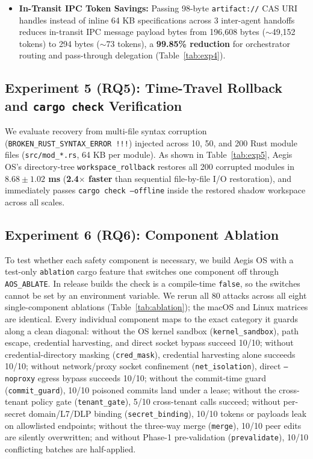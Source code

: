 \documentclass[acmsmall,screen,review]{acmart}
\begin{document}
\begin{itemize}
    \item \textbf{In-Transit IPC Token Savings:} Passing 98-byte \texttt{artifact://} CAS URI handles instead of inline 64 KB specifications across 3 inter-agent handoffs reduces in-transit IPC message payload bytes from 196,608 bytes ($\sim$49,152 tokens) to 294 bytes ($\sim$73 tokens), a \textbf{99.85\% reduction} for orchestrator routing and pass-through delegation (Table~\ref{tab:exp4}).
\end{itemize}

\subsection{Experiment 5 (RQ5): Time-Travel Rollback and \texttt{cargo check} Verification}

We evaluate recovery from multi-file syntax corruption (\texttt{BROKEN\_RUST\_SYNTAX\_ERROR !!!}) injected across 10, 50, and 200 Rust module files (\texttt{src/mod\_*.rs}, 64 KB per module). As shown in Table~\ref{tab:exp5}, Aegis OS's directory-tree \texttt{workspace\_rollback} restores all 200 corrupted modules in \textbf{$8.68 \pm 1.02$ ms} (\textbf{2.4$\times$ faster} than sequential file-by-file I/O restoration), and immediately passes \texttt{cargo check --offline} inside the restored shadow workspace across all scales.

\subsection{Experiment 6 (RQ6): Component Ablation}

To test whether each safety component is necessary, we build Aegis OS with a test-only \texttt{ablation} cargo feature that switches one component off through \texttt{AOS\_ABLATE}. In release builds the check is a compile-time \texttt{false}, so the switches cannot be set by an environment variable. We rerun all 80 attacks across all eight single-component ablations (Table~\ref{tab:ablation}); the macOS and Linux matrices are identical. Every individual component maps to the exact category it guards along a clean diagonal: without the OS kernel sandbox (\texttt{kernel\_sandbox}), path escape, credential harvesting, and direct socket bypass succeed 10/10; without credential-directory masking (\texttt{cred\_mask}), credential harvesting alone succeeds 10/10; without network/proxy socket confinement (\texttt{net\_isolation}), direct \texttt{--noproxy} egress bypass succeeds 10/10; without the commit-time guard (\texttt{commit\_guard}), 10/10 poisoned commits land under a lease; without the cross-tenant policy gate (\texttt{tenant\_gate}), 5/10 cross-tenant calls succeed; without per-secret domain/L7/DLP binding (\texttt{secret\_binding}), 10/10 tokens or payloads leak on allowlisted endpoints; without the three-way merge (\texttt{merge}), 10/10 peer edits are silently overwritten; and without Phase-1 pre-validation (\texttt{prevalidate}), 10/10 conflicting batches are half-applied.
\end{document}
